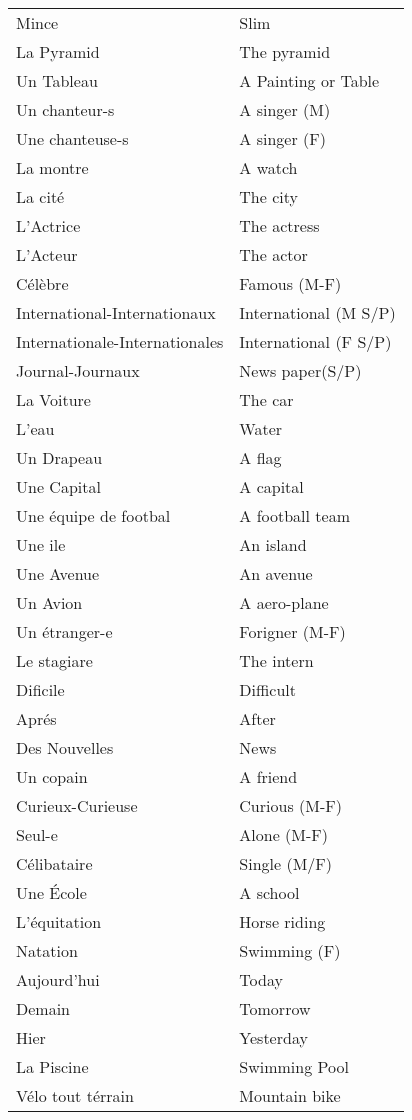 \begin{longtable}{l  l}
Mince		& Slim		\\
La Pyramid	& The pyramid	\\
Un Tableau	& A Painting or Table	\\
Un chanteur-s	& A singer (M)	\\
Une chanteuse-s	& A singer (F)	\\
La montre	& A watch	\\
La cit\'e	& The city	\\
L'Actrice	& The actress	\\
L'Acteur	& The actor	\\
C\'el\`ebre	& Famous (M-F)	\\
International-Internationaux	& International (M S/P)\\
Internationale-Internationales	& International (F S/P)\\
Journal-Journaux & News paper(S/P)\\
La Voiture	& The car	\\
L'eau		& Water		\\
Un Drapeau	& A flag	\\
Une Capital	& A capital	\\
Une \'equipe de footbal	& A football team\\
Une ile		& An island	\\
Une Avenue	& An avenue	\\
Un Avion	& A aero-plane	\\
Un \'etranger-e	& Forigner (M-F)\\
Le stagiare	& The intern	\\
Dificile	& Difficult	\\
Apr\'es		& After		\\
Des Nouvelles	& News		\\
Un copain	& A friend	\\
Curieux-Curieuse& Curious (M-F)	\\
Seul-e		& Alone (M-F)	\\
C\'elibataire	& Single (M/F)	\\
Une \'Ecole	& A school	\\
L'\'equitation & Horse riding \\
Natation & Swimming (F) \\
Aujourd'hui & Today \\
Demain & Tomorrow \\
Hier & Yesterday \\
La Piscine  & Swimming Pool \\
V\'elo tout t\'errain & Mountain bike\\

\end{longtable}
